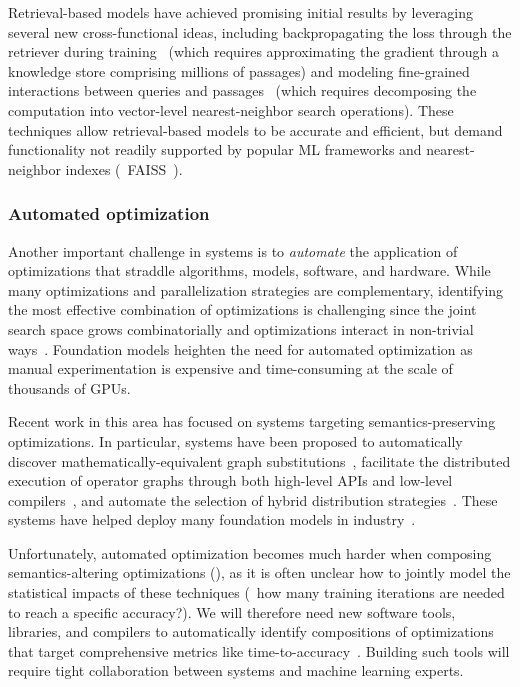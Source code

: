 Retrieval-based models have achieved promising initial results by leveraging several new cross-functional ideas, including backpropagating the loss through the retriever during training~\citep{guu2020realm} (which requires approximating the gradient through a knowledge store comprising millions of passages) and modeling fine-grained interactions between queries and passages~\citep{khattab2020colbert,Khattab-etal:2020:OpenQA} (which requires decomposing the computation into vector-level nearest-neighbor search operations). These techniques allow retrieval-based models to be accurate and efficient, but demand functionality not readily supported by popular ML frameworks and nearest-neighbor indexes (\eg~FAISS~\citep{johnson2019billion}). 


\subsubsection{Automated optimization}

Another important challenge in systems is to \emph{automate} the application of optimizations that straddle algorithms, models, software, and hardware. While many optimizations and parallelization strategies are complementary, identifying the most effective combination of optimizations is challenging since the joint search space grows combinatorially and optimizations interact in non-trivial ways~\citep{narayanan2021efficient}. Foundation models heighten the need for automated optimization as manual experimentation is expensive and time-consuming at the scale of thousands of GPUs.

Recent work in this area has focused on systems targeting semantics-preserving optimizations. In particular, systems have been proposed to automatically discover mathematically-equivalent graph substitutions~\citep{jia2019optimizing, wang2021pet}, facilitate the distributed execution of operator graphs through both high-level APIs and low-level compilers~\citep{rasley2020deepspeed, fairscale, jax2018github, shazeer2018mesh, lepikhin2020gshard}, and automate the selection of hybrid distribution strategies~\citep{jia2018beyond, santhanam2021distir}. These systems have helped deploy many foundation models in industry~\citep{fedus2021switch, m2m100, turingnlg}.

Unfortunately, automated optimization becomes much harder when composing semantics-altering optimizations (), as it is often unclear how to jointly model the statistical impacts  of these techniques (\eg~how many training iterations are needed to reach a specific accuracy?). We will therefore need new software tools, libraries, and compilers to automatically identify compositions of optimizations that target comprehensive metrics like time-to-accuracy~\citep{coleman2017dawnbench, mattson2020mlperf}. Building such tools will require tight collaboration between systems and machine learning experts.


